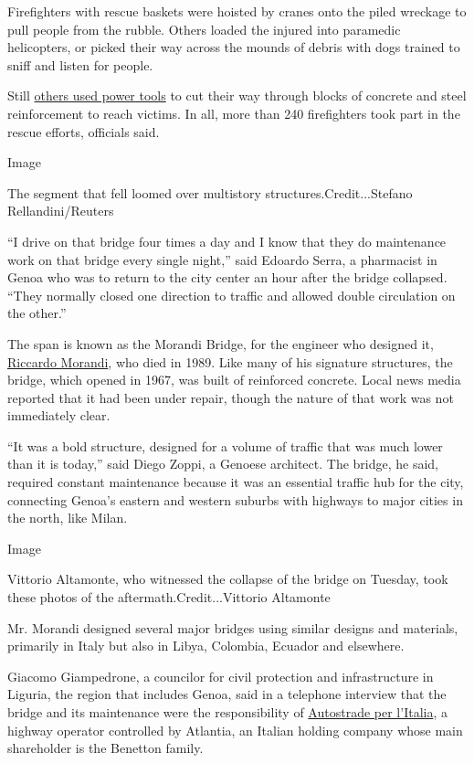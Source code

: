 Firefighters with rescue baskets were hoisted by cranes onto the piled
wreckage to pull people from the rubble. Others loaded the injured into
paramedic helicopters, or picked their way across the mounds of debris
with dogs trained to sniff and listen for people.

Still
\href{https://twitter.com/emergenzavvf/status/1029361007691526151}{others
used power tools} to cut their way through blocks of concrete and steel
reinforcement to reach victims. In all, more than 240 firefighters took
part in the rescue efforts, officials said.

Image

The segment that fell loomed over multistory structures.Credit...Stefano
Rellandini/Reuters

``I drive on that bridge four times a day and I know that they do
maintenance work on that bridge every single night,'' said Edoardo
Serra, a pharmacist in Genoa who was to return to the city center an
hour after the bridge collapsed. ``They normally closed one direction to
traffic and allowed double circulation on the other.''

The span is known as the Morandi Bridge, for the engineer who designed
it, \href{https://www.archinform.net/arch/1096.htm}{Riccardo Morandi},
who died in 1989. Like many of his signature structures, the bridge,
which opened in 1967, was built of reinforced concrete. Local news media
reported that it had been under repair, though the nature of that work
was not immediately clear.

``It was a bold structure, designed for a volume of traffic that was
much lower than it is today,'' said Diego Zoppi, a Genoese architect.
The bridge, he said, required constant maintenance because it was an
essential traffic hub for the city, connecting Genoa's eastern and
western suburbs with highways to major cities in the north, like Milan.

Image

Vittorio Altamonte, who witnessed the collapse of the bridge on Tuesday,
took these photos of the aftermath.Credit...Vittorio Altamonte

Mr. Morandi designed several major bridges using similar designs and
materials, primarily in Italy but also in Libya, Colombia, Ecuador and
elsewhere.

Giacomo Giampedrone, a councilor for civil protection and infrastructure
in Liguria, the region that includes Genoa, said in a telephone
interview that the bridge and its maintenance were the responsibility of
\href{https://www.autostrade.it/en/home}{Autostrade per l'Italia}, a
highway operator controlled by Atlantia, an Italian holding company
whose main shareholder is the Benetton family.

